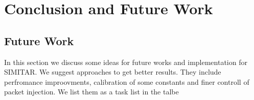 \chapter{Conclusion and Future Work}\label{ch:conclusion}





\section{Future Work}

In this section we discuss some ideas for future works and implementation for SIMITAR. We suggest approaches to get better results. They include perfromance improovments, calibration of some constants and finer controll of packet injection. We list them as a task list in the talbe  


